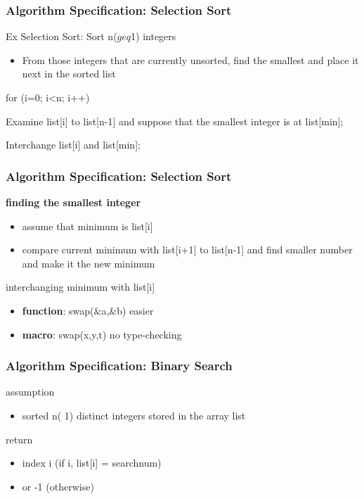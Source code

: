 \documentclass[newPxFont,sthlmFooter,nooffset]{beamer}
\begin{document}
\begin{frame}[t,fragile]
  \frametitle{Algorithm Specification: Selection Sort}
Ex Selection Sort: Sort n($geq$1) integers
\begin{itemize}
\item From those integers that are currently unsorted, find the smallest and place it next in the sorted list
\end{itemize}

\begin{codedef}
for (i=0; i<n; i++) {
    Examine list[i] to list[n-1] and suppose 
    that the smallest integer is at list[min];
  
    Interchange list[i] and list[min];
}
\end{codedef}

\end{frame}

\begin{frame}[t]
  \frametitle{Algorithm Specification: Selection Sort}

\textbf{finding the smallest integer}
\begin{itemize}
\item assume that minimum is list[i]
\item compare current minimum with list[i+1] to list[n-1] and find
  smaller number and make it the new minimum 
\end{itemize}

interchanging minimum with list[i]
\begin{itemize}
\item \textbf{function}: swap($\&$a,$\&$b) easier
\item \textbf{macro}: swap(x,y,t) no type-checking
\end{itemize}

\end{frame}

\begin{frame}[t]
  \frametitle{Algorithm Specification: Binary Search}
assumption
\begin{itemize}
\item sorted n( 1) distinct integers stored in the array list
\end{itemize}

return 
\begin{itemize}
\item index i (if i, list[i] = searchnum)
\item or -1 (otherwise)
\end{itemize}

\end{frame}
\end{document}

